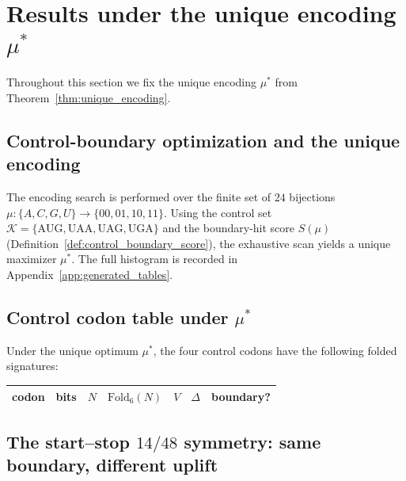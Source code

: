 \section{Results under the unique encoding \texorpdfstring{$\mu^\ast$}{mu*}}
\label{sec:results}

Throughout this section we fix the unique encoding $\mu^\ast$ from Theorem~\ref{thm:unique_encoding}.

\subsection{Control-boundary optimization and the unique encoding}
\label{sec:control_boundary_results}

The encoding search is performed over the finite set of $24$ bijections $\mu:\{A,C,G,U\}\to\{00,01,10,11\}$.
Using the control set $\mathcal{K}=\{\mathrm{AUG,UAA,UAG,UGA}\}$ and the boundary-hit score $S(\mu)$ (Definition~\ref{def:control_boundary_score}), the exhaustive scan yields a unique maximizer $\mu^\ast$.
The full histogram is recorded in Appendix~\ref{app:generated_tables}.


\subsection{Control codon table under \texorpdfstring{$\mu^\ast$}{mu*}}
\label{sec:control_codon_table}

Under the unique optimum $\mu^\ast$, the four control codons have the following folded signatures:
\begin{center}
\small
\setlength{\tabcolsep}{6pt}
\renewcommand{\arraystretch}{1.15}
\begin{tabular}{llllrrl}
\toprule
codon & bits & $N$ & $\mathrm{Fold}_6(N)$ & $V$ & $\Delta$ & boundary? \\
\midrule

\end{tabular}
\end{center}

\subsection{The start--stop \texorpdfstring{$14/48$}{14/48} symmetry: same boundary, different uplift}
\label{sec:start_stop_symmetry}

